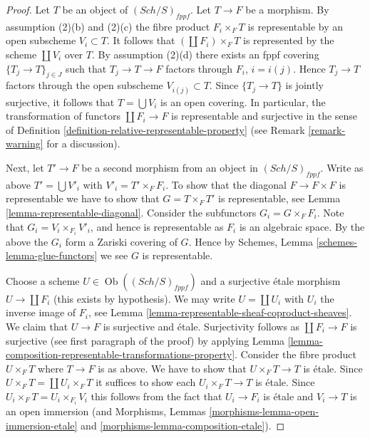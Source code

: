 \documentclass[10pt,a4paper]{amsart}
\theoremstyle{plain}
\theoremstyle{definition}
\theoremstyle{remark}
\numberwithin{equation}{subsection}
\def\Sch{\mathit{Sch}}
\def\Ob{\mathop{\mathrm{Ob}}\nolimits}
\begin{document}
\begin{proof}
Let $T$ be an object of $(\Sch/S)_{fppf}$. Let $T \to F$ be a morphism.
By assumption (2)(b) and (2)(c) the fibre product $F_i \times_F T$
is representable by an open subscheme $V_i \subset T$. It follows that
$(\coprod F_i) \times_F T$ is represented by the scheme $\coprod V_i$ over $T$.
By assumption (2)(d) there exists an fppf covering $\{T_j \to T\}_{j \in J}$
such that $T_j \to T \to F$ factors through $F_i$, $i = i(j)$.
Hence $T_j \to T$ factors through the open subscheme $V_{i(j)} \subset T$.
Since $\{T_j \to T\}$ is jointly surjective, it follows that
$T = \bigcup V_i$ is an open covering. In particular, the transformation
of functors $\coprod F_i \to F$ is representable
and surjective in the sense of
Definition \ref{definition-relative-representable-property}
(see Remark \ref{remark-warning} for a discussion).

\medskip\noindent
Next, let $T' \to F$ be a second morphism from an object in $(\Sch/S)_{fppf}$.
Write as above $T' = \bigcup V'_i$ with $V'_i = T' \times_F F_i$.
To show that the diagonal $F \to F \times F$ is representable
we have to show that $G = T \times_F T'$ is representable, see
Lemma \ref{lemma-representable-diagonal}.
Consider the subfunctors $G_i = G \times_F F_i$.
Note that $G_i = V_i \times_{F_i} V'_i$, and hence is representable
as $F_i$ is an algebraic space.
By the above the $G_i$ form a Zariski covering of $G$.
Hence by Schemes, Lemma \ref{schemes-lemma-glue-functors}
we see $G$ is representable.

\medskip\noindent
Choose a scheme $U \in \Ob((\Sch/S)_{fppf})$ and a surjective
\'etale morphism $U \to \coprod F_i$ (this exists by hypothesis).
We may write $U = \coprod U_i$ with $U_i$ the inverse image of $F_i$,
see Lemma \ref{lemma-representable-sheaf-coproduct-sheaves}.
We claim that $U \to F$ is surjective and \'etale. Surjectivity follows
as $\coprod F_i \to F$ is surjective (see first paragraph of the proof)
by applying
Lemma \ref{lemma-composition-representable-transformations-property}.
Consider the fibre product $U \times_F T$ where $T \to F$ is as
above. We have to show that $U \times_F T \to T$ is \'etale.
Since $U \times_F T = \coprod U_i \times_F T$ it suffices to show
each $U_i \times_F T \to T$ is \'etale. Since
$U_i \times_F T = U_i \times_{F_i} V_i$ this follows from the
fact that $U_i \to F_i$ is \'etale and $V_i \to T$ is an open immersion
(and Morphisms, Lemmas \ref{morphisms-lemma-open-immersion-etale}
and \ref{morphisms-lemma-composition-etale}).
\end{proof}
\end{document}

